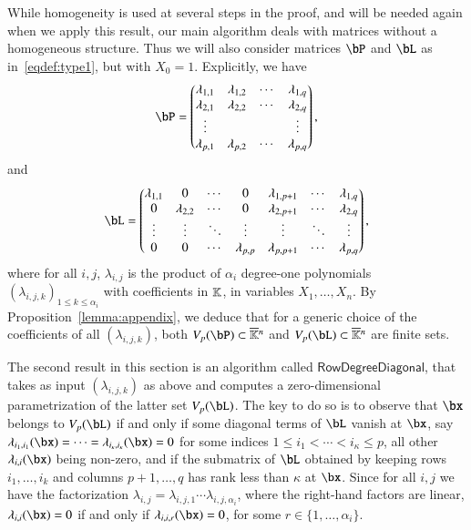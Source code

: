 \documentclass[amsthm]{elsart}
\begin{document}
While homogeneity is used at several steps in the proof, and will be
needed again when we apply this result, our main algorithm deals with
matrices without a homogeneous structure. Thus we will also consider 
matrices $\bP$ and $\bL$ as in~\eqref{eqdef:type1}, but with $X_0=1$. Explicitly,
we have
\begin{align}\label{eqdef:type2aff}
  \bP= \left( \begin{matrix}
    \lambda_{1,1} & \lambda_{1,2} & \cdots & \lambda_{1, q}\\
    \lambda_{2,1} &  \lambda_{2,2} & \cdots & \lambda_{2, q}\\
    \vdots & & & \vdots\\
    \lambda_{p,1} &  \lambda_{p,2}& \cdots & \lambda_{p, q}
  \end{matrix} \right),
\end{align}
and
\begin{align}\label{eqdef:type1aff}
\bL= \left( \begin{matrix}
\lambda_{1,1} & 0 & \cdots & 0 & \lambda_{1,p+1} & \cdots & \lambda_{1, q}\\
0 & \lambda_{2,2} & \cdots & 0 & \lambda_{2,p+1} & \cdots & \lambda_{2, q}\\
\vdots & \vdots & \ddots & \vdots & \vdots & \ddots & \vdots\\
0 & 0 & \cdots & \lambda_{p,p} & \lambda_{p,p+1} & \cdots & \lambda_{p, q}
\end{matrix} \right),
\end{align}
where for all $i,j$, $\lambda_{i,j}$ is the product of $\alpha_i$
degree-one polynomials $(\lambda_{i,j,k})_{1 \le k \le \alpha_i}$ with
coefficients in $\mathbb{K}$, in variables $X_1,\dots,X_n$. By
Proposition~\ref{lemma:appendix}, we deduce that for a generic choice
of the coefficients of all $(\lambda_{i,j,k})$, both $V_p(\bP) \subset
\KKbar{}^n$ and $V_p(\bL) \subset \KKbar{}^n$ are finite sets.

The second result in this section is an algorithm called
$\mathsf{RowDegreeDiagonal}$, that takes as input 
$(\lambda_{i,j,k})$ as above and computes a zero-dimensional parametrization of
the latter set $V_p(\bL)$. The key to do so is to observe that $\bx$
belongs to $V_p(\bL)$ if and only if some diagonal terms of $\bL$
vanish at $\bx$, say
$\lambda_{i_1,i_1}(\bx)=\cdots=\lambda_{i_\kappa,i_\kappa}(\bx)=0$ for
some indices $1 \le i_1 < \cdots < i_\kappa \le p$, all other
$\lambda_{i,i}(\bx)$ being non-zero, and if the submatrix of $\bL$
obtained by keeping rows $i_1,\dots,i_k$ and columns $p+1,\dots,q$ has
rank less than $\kappa$ at $\bx$. Since for all $i,j$ we have the
factorization
$\lambda_{i,j}=\lambda_{i,j,1}\cdots\lambda_{i,j,\alpha_i}$, where the
right-hand factors are linear, $\lambda_{i,i}(\bx)=0$ if and only if
$\lambda_{i,i,r}(\bx)=0$, for some $r \in \{1,\dots,\alpha_i\}$.
\end{document}
